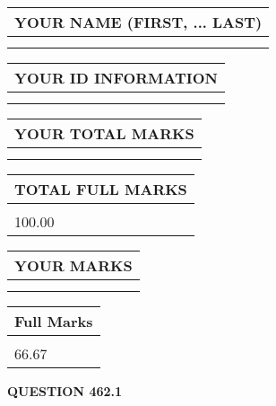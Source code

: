 \documentclass{ctexart}
\begin{document}
   
   
   
\newpage 
\setcounter{page}{ 
   462001 } 
   
   
   
   
\noindent\begin{tabular}{|l|}
\hline
YOUR NAME (FIRST, ... LAST)  \\
\hline
 \\ 
 \\ 
\hline
\end{tabular}
\hspace{0.05in} \begin{tabular}{|l|}
\hline
 YOUR   ID   INFORMATION  \\
\hline
 \\ 
 \\ 
\hline
\end{tabular}
   
   
\vspace{0.2in}\noindent\begin{tabular}{|l|}
\hline
YOUR TOTAL MARKS  \\
\hline
 \\ 
 \\ 
\hline
\end{tabular}
\hspace{0.05in} \begin{tabular}{|l|}
\hline
TOTAL FULL MARKS  \\
\hline
 \\ 
100.00 \\
\hline
\end{tabular}
   
   
 \vspace{0.2in}
 
 
 
 
   
   
  
\vspace{0.2in}
  
\noindent\begin{tabular}{|l|}
\hline
 YOUR MARKS  \\
\hline
 \\ 
 \\ 
\hline
\end{tabular}
\hspace{0.05in} \begin{tabular}{|l|}
\hline
 Full Marks  \\
\hline
 \\ 
66.67 \\
\hline
\end{tabular}
{\textbf{\Large{QUESTION
462.1 
}}}
  
\end{document}
